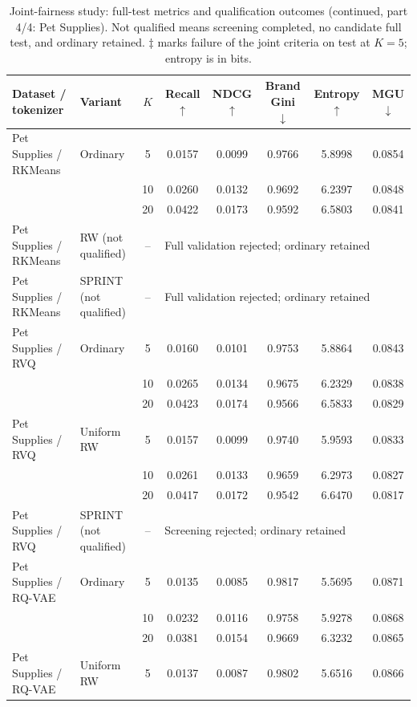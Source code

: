 \begin{table}[p]
\centering\small
\setlength{\tabcolsep}{3pt}
\addtocounter{table}{-1}
\caption[]{Joint-fairness study: full-test metrics and qualification outcomes (continued, part 4/4: Pet Supplies). Not qualified means screening completed, no candidate full test, and ordinary retained. $\ddagger$ marks failure of the joint criteria on test at $K=5$; entropy is in bits.}
\label{tab:joint-fairness-tests-pet-supplies}
\begin{tabular}{llcccccc}
\toprule
Dataset / tokenizer & Variant & $K$ & Recall $\uparrow$ & NDCG $\uparrow$ & Brand Gini $\downarrow$ & Entropy $\uparrow$ & MGU $\downarrow$ \\
\midrule
Pet Supplies / RKMeans & Ordinary & 5 & 0.0157 & 0.0099 & 0.9766 & 5.8998 & 0.0854 \\
 &  & 10 & 0.0260 & 0.0132 & 0.9692 & 6.2397 & 0.0848 \\
 &  & 20 & 0.0422 & 0.0173 & 0.9592 & 6.5803 & 0.0841 \\
Pet Supplies / RKMeans & RW (not qualified) & -- & \multicolumn{5}{l}{Full validation rejected; ordinary retained} \\
Pet Supplies / RKMeans & SPRINT (not qualified) & -- & \multicolumn{5}{l}{Full validation rejected; ordinary retained} \\
\midrule
Pet Supplies / RVQ & Ordinary & 5 & 0.0160 & 0.0101 & 0.9753 & 5.8864 & 0.0843 \\
 &  & 10 & 0.0265 & 0.0134 & 0.9675 & 6.2329 & 0.0838 \\
 &  & 20 & 0.0423 & 0.0174 & 0.9566 & 6.5833 & 0.0829 \\
Pet Supplies / RVQ & Uniform RW & 5 & 0.0157 & 0.0099 & 0.9740 & 5.9593 & 0.0833 \\
 &  & 10 & 0.0261 & 0.0133 & 0.9659 & 6.2973 & 0.0827 \\
 &  & 20 & 0.0417 & 0.0172 & 0.9542 & 6.6470 & 0.0817 \\
Pet Supplies / RVQ & SPRINT (not qualified) & -- & \multicolumn{5}{l}{Screening rejected; ordinary retained} \\
\midrule
Pet Supplies / RQ-VAE & Ordinary & 5 & 0.0135 & 0.0085 & 0.9817 & 5.5695 & 0.0871 \\
 &  & 10 & 0.0232 & 0.0116 & 0.9758 & 5.9278 & 0.0868 \\
 &  & 20 & 0.0381 & 0.0154 & 0.9669 & 6.3232 & 0.0865 \\
Pet Supplies / RQ-VAE & Uniform RW & 5 & 0.0137 & 0.0087 & 0.9802 & 5.6516 & 0.0866 \\

\end{tabular}
\end{table}
